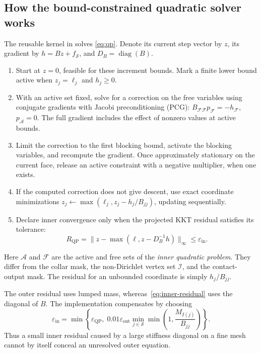 \documentclass[11pt,a4paper]{article}
\newcommand{\norm}[1]{\lVert #1\rVert}
\newcommand{\diag}{\operatorname{diag}}
\newcommand{\free}{\mathcal I}
\begin{document}
\subsection{How the bound-constrained quadratic solver works}
The reusable kernel in  solves
\eqref{eq:qp}. Denote its current step vector by \(z\), its gradient by
\(h=Bz+f_{\mathcal S}\), and \(D_B=\diag(B)\).
\begin{enumerate}
 \item Start at \(z=0\), feasible for these increment bounds. Mark a finite
 lower bound active when \(z_j=\ell_j\) and \(h_j\geq0\).
 \item With an active set fixed, solve for a correction on the free
 variables using conjugate gradients with Jacobi preconditioning (PCG):
 \(B_{\mathcal F\mathcal F}p_{\mathcal F}=-h_{\mathcal F}\),
 \(p_{\mathcal A}=0\). The full gradient includes the effect of nonzero
 values at active bounds.
 \item Limit the correction to the first blocking bound, activate the
 blocking variables, and recompute the gradient. Once approximately
 stationary on the current face, release an active constraint with a
 negative multiplier, when one exists.
 \item If the computed correction does not give descent, use exact
 coordinate minimizations
 \(z_j\leftarrow\max(\ell_j,z_j-h_j/B_{jj})\), updating sequentially.
 \item Declare inner convergence only when the projected KKT residual
 satisfies its tolerance:
 \begin{equation}
 R_{\mathrm{QP}}=
 \norm{z-\max(\ell,z-D_B^{-1}h)}_\infty\leq\varepsilon_{\mathrm{in}}.
 \label{eq:inner-residual}
 \end{equation}
\end{enumerate}
Here \(\mathcal A\) and \(\mathcal F\) are the active and free sets of
the \emph{inner quadratic problem}. They differ from the collar mask,
the non-Dirichlet vertex set \(\free\), and the contact-output mask.
The residual for an unbounded coordinate is simply \(h_j/B_{jj}\).

The outer residual uses lumped mass, whereas~\eqref{eq:inner-residual}
uses the diagonal of \(B\). The implementation compensates by choosing
\begin{equation}
 \varepsilon_{\mathrm{in}}=
 \min\left\{\varepsilon_{\mathrm{QP}},\;
 0.01\varepsilon_{\mathrm{out}}
 \min_{j\in\mathcal S}\min\left(1,\frac{M_{I(j)}}{B_{jj}}\right)\right\}.
\end{equation}
Thus a small inner residual caused by a large stiffness diagonal on a fine
mesh cannot by itself conceal an unresolved outer equation.
\end{document}
